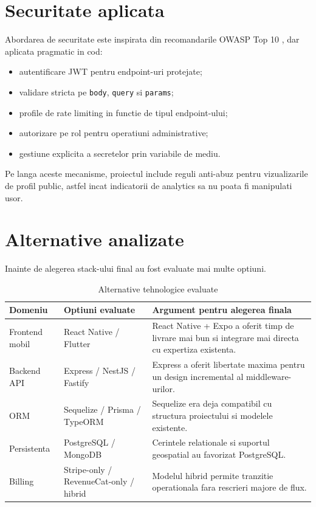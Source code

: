 \section{Securitate aplicata}

Abordarea de securitate este inspirata din recomandarile OWASP Top 10 \parencite{owasp2021top10}, dar aplicata pragmatic in cod:
\begin{itemize}[leftmargin=1.2cm]
    \item autentificare JWT pentru endpoint-uri protejate;
    \item validare stricta pe \texttt{body}, \texttt{query} si \texttt{params};
    \item profile de rate limiting in functie de tipul endpoint-ului;
    \item autorizare pe rol pentru operatiuni administrative;
    \item gestiune explicita a secretelor prin variabile de mediu.
\end{itemize}

Pe langa aceste mecanisme, proiectul include reguli anti-abuz pentru vizualizarile de profil public, astfel incat indicatorii de analytics sa nu poata fi manipulati usor.

\section{Alternative analizate}

Inainte de alegerea stack-ului final au fost evaluate mai multe optiuni.

\begin{table}[H]
\centering
\caption{Alternative tehnologice evaluate}
\begin{tabular}{p{} p{} p{}}
\toprule
\textbf{Domeniu} & \textbf{Optiuni evaluate} & \textbf{Argument pentru alegerea finala} \\
\midrule
Frontend mobil & React Native / Flutter & React Native + Expo a oferit timp de livrare mai bun si integrare mai directa cu expertiza existenta. \\
Backend API & Express / NestJS / Fastify & Express a oferit libertate maxima pentru un design incremental al middleware-urilor. \\
ORM & Sequelize / Prisma / TypeORM & Sequelize era deja compatibil cu structura proiectului si modelele existente. \\
Persistenta & PostgreSQL / MongoDB & Cerintele relationale si suportul geospatial au favorizat PostgreSQL. \\
Billing & Stripe-only / RevenueCat-only / hibrid & Modelul hibrid permite tranzitie operationala fara rescrieri majore de flux. \\
\bottomrule
\end{tabular}
\end{table}

